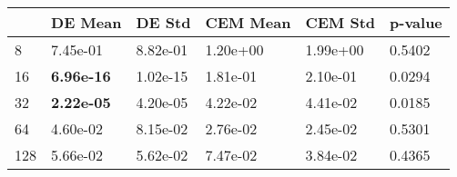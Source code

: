 \begin{tabular}{llllll}
\toprule
{} &            DE Mean &    DE Std &  CEM Mean &   CEM Std & p-value \\
\midrule
8   &           7.45e-01 &  8.82e-01 &  1.20e+00 &  1.99e+00 &  0.5402 \\
16  &  \textbf{6.96e-16} &  1.02e-15 &  1.81e-01 &  2.10e-01 &  0.0294 \\
32  &  \textbf{2.22e-05} &  4.20e-05 &  4.22e-02 &  4.41e-02 &  0.0185 \\
64  &           4.60e-02 &  8.15e-02 &  2.76e-02 &  2.45e-02 &  0.5301 \\
128 &           5.66e-02 &  5.62e-02 &  7.47e-02 &  3.84e-02 &  0.4365 \\
\bottomrule
\end{tabular}
